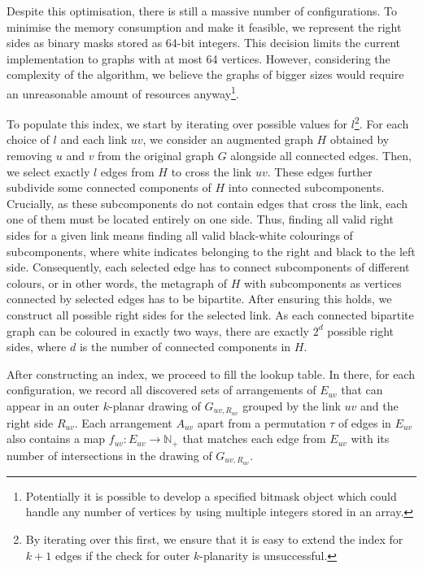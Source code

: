 Despite this optimisation, there is still a massive number of configurations. To minimise the memory consumption and make it feasible, we represent the right sides as binary masks stored as 64-bit integers. This decision limits the current implementation to graphs with at most 64 vertices. However, considering the complexity of the algorithm, we believe the graphs of bigger sizes would require an unreasonable amount of resources anyway\footnote{Potentially it is possible to develop a specified bitmask object which could handle any number of vertices by using multiple integers stored in an array.}.

To populate this index, we start by iterating over possible values for \(l\)\footnote{By iterating over this first, we ensure that it is easy to extend the index for \(k+1\) edges if the check for outer \(k\)-planarity is unsuccessful.}. For each choice of \(l\) and each link \(uv\), we consider an augmented graph \(H\) obtained by removing \(u\) and \(v\) from the original graph \(G\) alongside all connected edges. Then, we select exactly \(l\) edges from \(H\) to cross the link \(uv\). These edges further subdivide some connected components of \(H\) into connected subcomponents. Crucially, as these subcomponents do not contain edges that cross the link, each one of them must be located entirely on one side. Thus, finding all valid right sides for a given link means finding all valid black-white colourings of subcomponents, where white indicates belonging to the right and black to the left side. Consequently, each selected edge has to connect subcomponents of different colours, or in other words, the metagraph of \(H\) with subcomponents as vertices connected by selected edges has to be bipartite. After ensuring this holds, we construct all possible right sides for the selected link. As each connected bipartite graph can be coloured in exactly two ways, there are exactly \(2^d\) possible right sides, where \(d\) is the number of connected components in \(H\).

After constructing an index, we proceed to fill the lookup table. In there, for each configuration, we record all discovered sets of arrangements of \(E_{uv}\) that can appear in an outer \(k\)-planar drawing of \(G_{uv, R_{uv}}\) grouped by the link \(uv\) and the right side \(R_{uv}\). Each arrangement \(A_{uv}\) apart from a permutation \(\tau\) of edges in \(E_{uv}\) also contains a map \(f_{uv}:E_{uv}\rightarrow \mathbb{N}_+\) that matches each edge from \(E_{uv}\) with its number of intersections in the drawing of \(G_{uv, R_{uv}}\).

